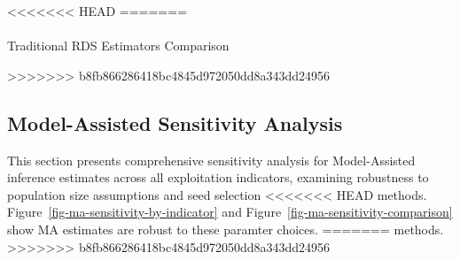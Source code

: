 \documentclass[
  12pt,
  letterpaper,
  DIV=11,
  numbers=noendperiod]{scrartcl}
\makeatletter
\let\oldparagraph\paragraph
\renewcommand{\paragraph}{
    \@ifstar
      \xxxParagraphStar
      \xxxParagraphNoStar
  }
\newcommand{\xxxParagraphStar}[1]{\oldparagraph*{#1}\mbox{}}
\newcommand{\xxxParagraphNoStar}[1]{\oldparagraph{#1}\mbox{}}
\theoremstyle{plain}
\theoremstyle{definition}
\makeatother
\begin{document}
{\begin{table}
{}

\end{table}%

<<<<<<< HEAD
=======
\paragraph{Traditional RDS Estimators
Comparison}\label{traditional-rds-estimators-comparison}

\begin{table}

\caption{\label{tbl-rds-comparison}RDS Estimator Comparison for Binary
Indicators. Source: Authors' Own Work.}


\end{table}%

>>>>>>> b8fb866286418bc4845d972050dd8a343dd24956
\subsection{Model-Assisted Sensitivity
Analysis}\label{model-assisted-sensitivity-analysis}

This section presents comprehensive sensitivity analysis for
Model-Assisted inference estimates across all exploitation indicators,
examining robustness to population size assumptions and seed selection
<<<<<<< HEAD
methods. Figure~\ref{fig-ma-sensitivity-by-indicator} and
Figure~\ref{fig-ma-sensitivity-comparison} show MA estimates are robust
to these paramter choices.
=======
methods.
>>>>>>> b8fb866286418bc4845d972050dd8a343dd24956

\begin{table}

\caption{\label{tbl-ma-sensitivity-full}Model-Assisted Sensitivity
Analysis: Point estimates and 95\% credible intervals across all
parameter combinations. Estimates from Gile \& Handcock (2015) Bayesian
Model-Assisted inference.}

\centering{

\begingroup\fontsize{7}{9}\selectfont

}
\end{table}}
\end{document}
